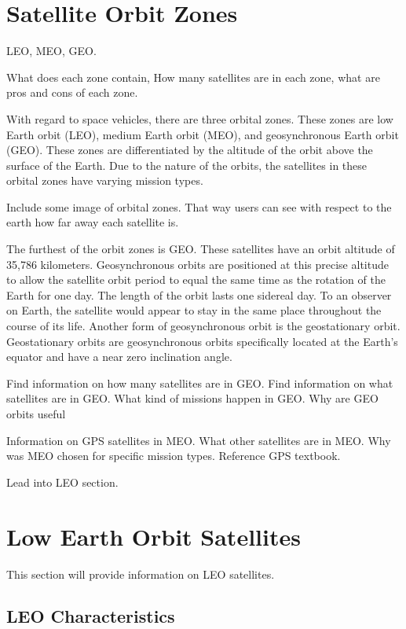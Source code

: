 \documentclass[12pt]{report}
\begin{document}
\section{Satellite Orbit Zones}
LEO, MEO, GEO.

What does each zone contain, How many satellites are in each zone, what are pros and cons of each zone.

With regard to space vehicles, there are three orbital zones. These zones are low Earth orbit (LEO), medium Earth orbit (MEO), and geosynchronous Earth orbit (GEO). These zones are differentiated by the altitude of the orbit above the surface of the Earth. Due to the nature of the orbits, the satellites in these orbital zones have varying mission types. 

Include some image of orbital zones. That way users can see with respect to the earth how far away each satellite is. 


The furthest of the orbit zones is GEO. These satellites have an orbit altitude of 35,786 kilometers. Geosynchronous orbits are positioned at this precise altitude to allow the satellite orbit period to equal the same time as the rotation of the Earth for one day. The length of the orbit lasts one sidereal day. To an observer on Earth, the satellite would appear to stay in the same place throughout the course of its life. Another form of geosynchronous orbit is the geostationary orbit. Geostationary orbits are geosynchronous orbits specifically located at the Earth's equator and have a near zero inclination angle. 

Find information on how many satellites are in GEO. Find information on what satellites are in GEO. What kind of missions happen in GEO. Why are GEO orbits useful 


Information on GPS satellites in MEO. What other satellites are in MEO. Why was MEO chosen for specific mission types. Reference GPS textbook. 

Lead into LEO section. 

\section{Low Earth Orbit Satellites}
This section will provide information on LEO satellites.

\subsection{LEO Characteristics}
\end{document}
